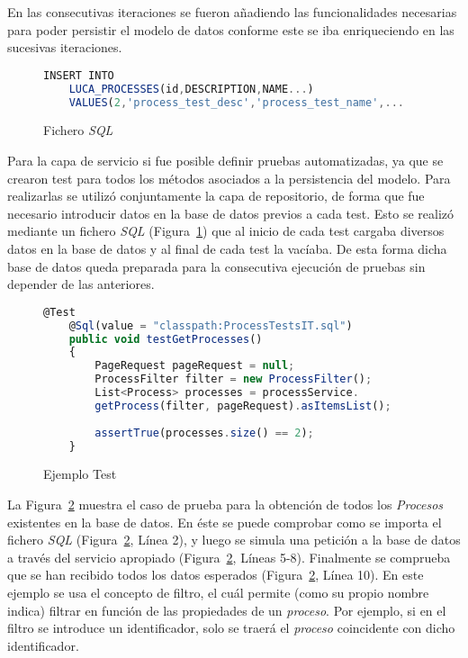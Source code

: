 En las consecutivas iteraciones se fueron añadiendo las funcionalidades necesarias para poder persistir el modelo de datos conforme este se iba enriqueciendo en las sucesivas iteraciones. 

\begin{figure}[H]
	\centering
	\begin{lstlisting}[language=Javascript]
	INSERT INTO
	LUCA_PROCESSES(id,DESCRIPTION,NAME...)
	VALUES(2,'process_test_desc','process_test_name',...\end{lstlisting}
	\caption{Fichero \emph{SQL}}
	\label{fig:sqlFile}
\end{figure}

Para la capa de servicio si fue posible definir pruebas automatizadas, ya que se crearon test para todos los métodos asociados a la persistencia del modelo. Para realizarlas se utilizó conjuntamente la capa de repositorio, de forma que fue necesario introducir datos en la base de datos previos a cada test. Esto se realizó mediante un fichero \emph{SQL} (Figura~\ref{fig:sqlFile}) que al inicio de cada test cargaba diversos datos en la base de datos y al final de cada test la vacíaba. De esta forma dicha base de datos queda preparada para la consecutiva ejecución de pruebas sin depender de las anteriores.

\begin{figure}[H]
	\centering
	\begin{lstlisting}[language=Javascript]
	@Test
	@Sql(value = "classpath:ProcessTestsIT.sql")
	public void testGetProcesses()
	{
		PageRequest pageRequest = null;
		ProcessFilter filter = new ProcessFilter();
		List<Process> processes = processService.
		getProcess(filter, pageRequest).asItemsList();
		
		assertTrue(processes.size() == 2);
	}\end{lstlisting}
	\caption{Ejemplo Test}
	\label{fig:testExample}
\end{figure}


La Figura~\ref{fig:testExample} muestra el caso de prueba para la obtención de todos los \emph{Procesos} existentes en la base de datos. En éste se puede comprobar como se importa el fichero \emph{SQL} (Figura~\ref{fig:testExample}, Línea 2), y luego se simula una petición a la base de datos a través del servicio apropiado (Figura~\ref{fig:testExample}, Líneas 5-8). Finalmente se comprueba que se han recibido todos los datos esperados (Figura~\ref{fig:testExample}, Línea 10). En este ejemplo se usa el concepto de filtro, el cuál permite (como su propio nombre indica) filtrar en función de las propiedades de un \emph{proceso}. Por ejemplo, si en el filtro se introduce un identificador, solo se traerá el \emph{proceso} coincidente con dicho identificador.

